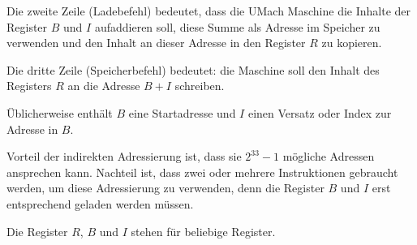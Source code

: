 Die zweite Zeile (Ladebefehl) bedeutet, dass die UMach Maschine die Inhalte der
Register $B$ und $I$ aufaddieren soll, diese Summe als Adresse im
Speicher zu verwenden und den Inhalt an dieser Adresse in den Register $R$ zu
kopieren.

Die dritte Zeile (Speicherbefehl) bedeutet: die Maschine soll den Inhalt des
Registers $R$ an die Adresse $B + I$ schreiben.

Üblicherweise enthält $B$ eine Startadresse und $I$ einen Versatz oder Index zur
Adresse in $B$.

Vorteil der indirekten Adressierung ist, dass sie $2^{33} - 1$ mögliche Adressen
ansprechen kann. Nachteil ist, dass zwei oder mehrere Instruktionen gebraucht
werden, um diese Adressierung zu verwenden, denn die Register $B$ und $I$ erst
entsprechend geladen werden müssen.

Die Register $R$, $B$ und $I$ stehen für beliebige Register.
